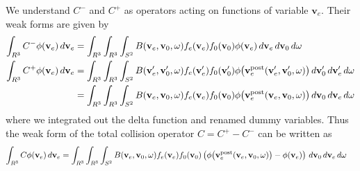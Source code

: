 \documentclass{article}
\newcommand{\diff}[1]{\, d#1}
\newcommand{\vect}[1]{\mathbf{#1}}
\newcommand{\of}[1]{\mleft( #1 \mright)}
\begin{document}
We understand $C^-$ and $C^+$ as operators acting on functions of variable $\vect{v}_e$. Their weak forms are given by
\begin{align*}
\int_{R^3} C^- \phi\of{\vect{v}_e} \diff{\vect{v}_e} 
&=
\int_{R^3} \int_{R^3} \int_{S^2} 
B\of{\vect{v}_e, \vect{v}_0, \vect{\omega}} 
f_e\of{\vect{v}_e} f_0\of{\vect{v}_0} 
\phi\of{\vect{v}_e} 
\diff{\vect{v}_e} \diff{\vect{v}_0} \diff{\vect{\omega}}
\\
\int_{R^3} C^+ \phi\of{\vect{v}_e} \diff{\vect{v}_e} 
&= 
\int_{R^3} \int_{R^3} \int_{S^2} 
B\of{\vect{v}_e^\prime, \vect{v}_0^\prime, \vect{\omega}} 
f_e\of{\vect{v}_e^\prime} f_0\of{\vect{v}_0^\prime} 
\phi\of{\vect{v}_e^\text{post}\of{\vect{v}_e^\prime, \vect{v}_0^\prime, \vect{\omega}}} 
\diff{\vect{v}_0^\prime} \diff{\vect{v}_e^\prime} \diff{\vect{\omega}}
\\
&= 
\int_{R^3} \int_{R^3} \int_{S^2} 
B\of{\vect{v}_e, \vect{v}_0, \vect{\omega}} 
f_e\of{\vect{v}_e} f_0\of{\vect{v}_0} 
\phi\of{\vect{v}_e^\text{post}\of{\vect{v}_e, \vect{v}_0, \vect{\omega}}} 
\diff{\vect{v}_0} \diff{\vect{v}_e} \diff{\vect{\omega}}
\end{align*}
where we integrated out the delta function and renamed dummy variables. Thus the weak form of the total collision operator $C = C^+ - C^-$ can be written as 
\begin{align*}
\int_{R^3} C \phi\of{\vect{v}_e} \diff{\vect{v}_e} 
&=
\int_{R^3} \int_{R^3} \int_{S^2} 
B\of{\vect{v}_e, \vect{v}_0, \vect{\omega}} 
f_e\of{\vect{v}_e} f_0\of{\vect{v}_0} 
\left(
\phi\of{\vect{v}_e^\text{post}\of{\vect{v}_e, \vect{v}_0, \vect{\omega}}} 
- \phi\of{\vect{v}_e} 
\right)
\diff{\vect{v}_0} \diff{\vect{v}_e} \diff{\vect{\omega}}
\end{align*}
\end{document}
